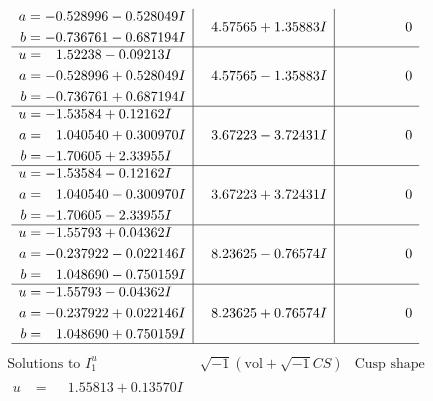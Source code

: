\documentclass[1p]{elsarticle_modified}
\theoremstyle{definition}
\newcommand{\I}{\sqrt{-1}}
\begin{document}
$$\begin{array}{c|c|c}
\begin{aligned}
a &= -0.528996 - 0.528049 I \\
b &= -0.736761 - 0.687194 I\end{aligned}
 & \phantom{-}4.57565 + 1.35883 I & \phantom{-0.000000 } 0 \\ \hline\begin{aligned}
u &= \phantom{-}1.52238 - 0.09213 I \\
a &= -0.528996 + 0.528049 I \\
b &= -0.736761 + 0.687194 I\end{aligned}
 & \phantom{-}4.57565 - 1.35883 I & \phantom{-0.000000 } 0 \\ \hline\begin{aligned}
u &= -1.53584 + 0.12162 I \\
a &= \phantom{-}1.040540 + 0.300970 I \\
b &= -1.70605 + 2.33955 I\end{aligned}
 & \phantom{-}3.67223 - 3.72431 I & \phantom{-0.000000 } 0 \\ \hline\begin{aligned}
u &= -1.53584 - 0.12162 I \\
a &= \phantom{-}1.040540 - 0.300970 I \\
b &= -1.70605 - 2.33955 I\end{aligned}
 & \phantom{-}3.67223 + 3.72431 I & \phantom{-0.000000 } 0 \\ \hline\begin{aligned}
u &= -1.55793 + 0.04362 I \\
a &= -0.237922 - 0.022146 I \\
b &= \phantom{-}1.048690 - 0.750159 I\end{aligned}
 & \phantom{-}8.23625 - 0.76574 I & \phantom{-0.000000 } 0 \\ \hline\begin{aligned}
u &= -1.55793 - 0.04362 I \\
a &= -0.237922 + 0.022146 I \\
b &= \phantom{-}1.048690 + 0.750159 I\end{aligned}
 & \phantom{-}8.23625 + 0.76574 I & \phantom{-0.000000 } 0\\
 \hline 
 \end{array}$$\newpage$$\begin{array}{c|c|c}  
\text{Solutions to }I^u_{1}& \I (\text{vol} + \sqrt{-1}CS) & \text{Cusp shape}\\
 \hline 
\begin{aligned}
u &= \phantom{-}1.55813 + 0.13570 I \\

\end{aligned}
\end{array}$$
\end{document}
